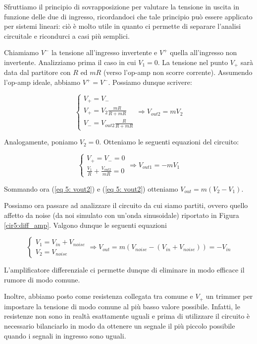Sfruttiamo il principio di sovrapposizione per valutare la tensione in uscita in funzione delle due di ingresso, ricordandoci che tale principio può essere applicato per sistemi lineari: ciò è molto utile in quanto ci permette di separare l'analisi circuitale e ricondurci a casi più semplici.

Chiamiamo $V^-$ la tensione all'ingresso invertente e $V^+$ quella all'ingresso non invertente. Analizziamo prima il caso in cui $V_1=0$. La tensione nel punto $V_+$ sarà data dal partitore con $R$ ed $mR$ (verso l'op-amp non scorre corrente). Assumendo l'op-amp ideale, abbiamo $V^+=V^-$. Possiamo dunque scrivere:

\begin{equation}
\begin{cases} V_+=V_-  \\ V_+=V_2\frac{mR}{R+mR} \\ V_-= V_{out2}\frac{R}{R+mR}\end{cases}  \Rightarrow V_{out2}=mV_2
\label{eq 5: vout2}
\end{equation}

Analogamente, poniamo $V_2=0$. Otteniamo le seguenti equazioni del circuito:

\begin{equation}
\begin{cases} V_+=V_-=0  \\ \frac{V_1}{R}+\frac{V_{out2}}{mR}=0 \end{cases}  \Rightarrow V_{out1}=-mV_1
\label{eq 5: vout1}
\end{equation}

Sommando ora (\ref{eq 5: vout2}) e (\ref{eq 5: vout2}) otteniamo $V_{out}=m(V_2-V_1)$.

Possiamo ora passare ad analizzare il circuito da cui siamo partiti, ovvero quello affetto da noise (da noi simulato con un'onda sinusoidale) riportato in Figura \ref{cir5:diff_amp}. Valgono dunque le seguenti equazioni

$$
\begin{cases} V_1=V_{in}+V_{noise} \\ V_2=V_{noise} \end{cases}  \Rightarrow V_{out}=m(V_{noise}-(V_{in}+V_{noise}))=-V_{in}
$$

L'amplificatore differenziale ci permette dunque di eliminare in modo efficace il rumore di modo comune. 

Inoltre, abbiamo posto come resistenza collegata tra comune e $V_+$ un trimmer per impostare la tensione di modo comune al più basso valore possibile. Infatti, le resistenze non sono in realtà esattamente uguali e prima di utilizzare il circuito è necessario bilanciarlo in modo da ottenere un segnale il più piccolo possibile quando i segnali in ingresso sono uguali.

